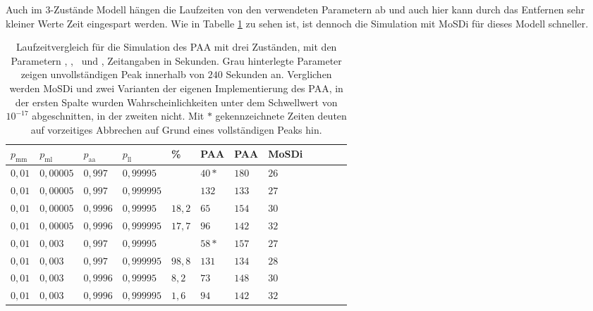 Auch im 3-Zustände Modell hängen die Laufzeiten von den verwendeten Parametern ab und auch hier kann durch das Entfernen sehr kleiner Werte Zeit eingespart werden. Wie in Tabelle \ref{3s_laufzeit_paa} zu sehen ist, ist dennoch die Simulation mit MoSDi für dieses Modell schneller.

\begin{table}[h]
\centering 
\caption[Laufzeitvergleich für die Simulation des PAA mit drei Zuständen]{Laufzeitvergleich für die Simulation des PAA mit drei Zuständen, mit den Parametern \pmm, \pml, \paa\ und \pll, Zeitangaben in Sekunden. Grau hinterlegte Parameter zeigen unvollständigen Peak innerhalb von $240$ Sekunden an. Verglichen werden MoSDi und zwei Varianten der eigenen Implementierung des PAA, in der ersten Spalte wurden Wahrscheinlichkeiten unter dem Schwellwert von $10^{-17}$ abgeschnitten, in der zweiten nicht. Mit $*$ gekennzeichnete Zeiten deuten auf vorzeitiges Abbrechen auf Grund eines vollständigen Peaks hin.}
\label{3s_laufzeit_paa}
\begin{tabular}{|l|l|l|l||l||l|l|l|l|l|l|l|}
\hline
$p_\text{mm}$ & $p_\text{ml}$ & $p_\text{aa}$ & $p_\text{ll}$ & \% & PAA & PAA & MoSDi \\ \hline \hline
$ 0,01 $ & $0,00005$ & $0,997$  & $0,99995$  &&  $40* $ & $180  $ & $26 $  \\ \hline
$ 0,01 $ & $0,00005$ & $0,997$  & $0,999995$ &&  $132  $ & $133  $ & $27 $  \\ \hline
\cellcolor{gray!25}$ 0,01 $ & \cellcolor{gray!25}$0,00005$ & \cellcolor{gray!25}$0,9996$ & \cellcolor{gray!25}$0,99995$  &$18,2$& $65 $ & $154  $ & $30 $  \\ \hline
\cellcolor{gray!25}$ 0,01 $ & \cellcolor{gray!25}$0,00005$ & \cellcolor{gray!25}$0,9996$ & \cellcolor{gray!25}$0,999995$ &$17,7$& $96 $ & $142  $ & $ 32 $  \\ \hline
$ 0,01 $ & $0,003 $  & $0,997$  & $0,99995$  &&  $58*  $ & $157  $ & $27 $  \\ \hline
\cellcolor{gray!25}$ 0,01 $ & \cellcolor{gray!25}\cellcolor{gray!25}$0,003 $  & \cellcolor{gray!25}$0,997$  & \cellcolor{gray!25}$0,999995$ &$98,8$&$131  $ & $134  $ & $ 28 $  \\ \hline
\cellcolor{gray!25}$ 0,01 $ & \cellcolor{gray!25}$0,003 $  & \cellcolor{gray!25}\cellcolor{gray!25}$0,9996$ & \cellcolor{gray!25}$0,99995$  &$8,2$& $73  $ & $148  $ & $ 30  $  \\ \hline
\cellcolor{gray!25}$ 0,01 $ & \cellcolor{gray!25}$0,003 $  & \cellcolor{gray!25}\cellcolor{gray!25}$0,9996$ & \cellcolor{gray!25}$0,999995$ &$1,6$& $94  $ & $142  $ & $32 $  \\ \hline

\end{tabular}
\end{table}
